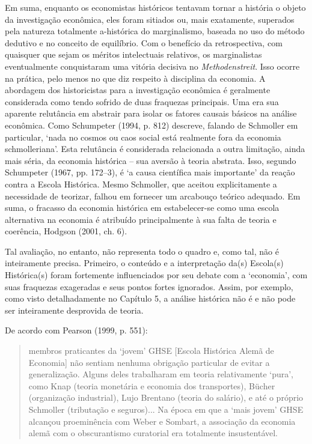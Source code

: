 \documentclass[12pt]{article}
\begin{document}
Em suma, enquanto os economistas históricos tentavam tornar a história o objeto da investigação econômica, eles foram sitiados ou, mais exatamente, superados pela natureza totalmente a-histórica do marginalismo, baseada no uso do método dedutivo e no conceito de equilíbrio. Com o benefício da retrospectiva, com quaisquer que sejam os méritos intelectuais relativos, os marginalistas eventualmente conquistaram uma vitória decisiva no \textit{Methodenstreit}. Isso ocorre na prática, pelo menos no que diz respeito à disciplina da economia. A abordagem dos historicistas para a investigação econômica é geralmente considerada como tendo sofrido de duas fraquezas principais. Uma era sua aparente relutância em abstrair para isolar os fatores causais básicos na análise econômica. Como Schumpeter (1994, p. 812) descreve, falando de Schmoller em particular, ‘nada no cosmos ou caos social está realmente fora da economia schmolleriana’. Esta relutância é considerada relacionada a outra limitação, ainda mais séria, da economia histórica – sua aversão à teoria abstrata. Isso, segundo Schumpeter (1967, pp. 172–3), é ‘a causa científica mais importante’ da reação contra a Escola Histórica. Mesmo Schmoller, que aceitou explicitamente a necessidade de teorizar, falhou em fornecer um arcabouço teórico adequado. Em suma, o fracasso da economia histórica em estabelecer-se como uma escola alternativa na economia é atribuído principalmente à sua falta de teoria e coerência, Hodgson (2001, ch. 6).

Tal avaliação, no entanto, não representa todo o quadro e, como tal, não é inteiramente precisa. Primeiro, o conteúdo e a interpretação da(s) Escola(s) Histórica(s) foram fortemente influenciados por seu debate com a ‘economia’, com suas fraquezas exageradas e seus pontos fortes ignorados. Assim, por exemplo, como visto detalhadamente no Capítulo 5, a análise histórica não é e não pode ser inteiramente desprovida de teoria.

De acordo com Pearson (1999, p. 551):

\begin{quote}
membros praticantes da ‘jovem’ GHSE [Escola Histórica Alemã de Economia] não sentiam nenhuma obrigação particular de evitar a generalização. Alguns deles trabalharam em teoria relativamente ‘pura’, como Knap (teoria monetária e economia dos transportes), Bücher (organização industrial), Lujo Brentano (teoria do salário), e até o próprio Schmoller (tributação e seguros)... Na época em que a ‘mais jovem’ GHSE alcançou proeminência com Weber e Sombart, a associação da economia alemã com o obscurantismo curatorial era totalmente insustentável.
\end{quote}
\end{document}
